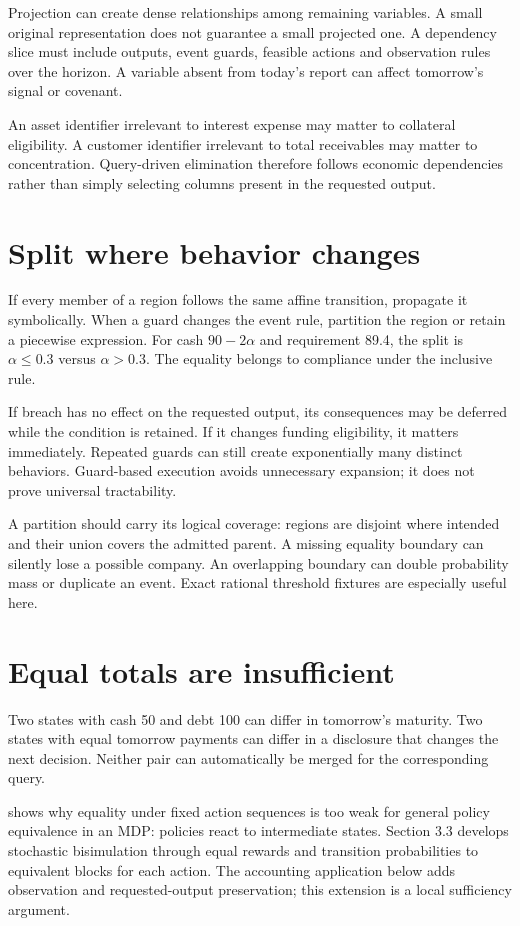 Projection can create dense relationships among remaining variables. A small original representation does not guarantee a small projected one. A dependency slice must include outputs, event guards, feasible actions and observation rules over the horizon. A variable absent from today's report can affect tomorrow's signal or covenant.

An asset identifier irrelevant to interest expense may matter to collateral eligibility. A customer identifier irrelevant to total receivables may matter to concentration. Query-driven elimination therefore follows economic dependencies rather than simply selecting columns present in the requested output.

\section{Split where behavior changes}
If every member of a region follows the same affine transition, propagate it symbolically. When a guard changes the event rule, partition the region or retain a piecewise expression. For cash $90-2\alpha$ and requirement 89.4, the split is $\alpha\leq0.3$ versus $\alpha>0.3$. The equality belongs to compliance under the inclusive rule.

If breach has no effect on the requested output, its consequences may be deferred while the condition is retained. If it changes funding eligibility, it matters immediately. Repeated guards can still create exponentially many distinct behaviors. Guard-based execution avoids unnecessary expansion; it does not prove universal tractability.

A partition should carry its logical coverage: regions are disjoint where intended and their union covers the admitted parent. A missing equality boundary can silently lose a possible company. An overlapping boundary can double probability mass or duplicate an event. Exact rational threshold fixtures are especially useful here.

\section{Equal totals are insufficient}
Two states with cash 50 and debt 100 can differ in tomorrow's maturity. Two states with equal tomorrow payments can differ in a disclosure that changes the next decision. Neither pair can automatically be merged for the corresponding query.

\citet[Section 3.1]{givan2003} shows why equality under fixed action sequences is too weak for general policy equivalence in an MDP: policies react to intermediate states. Section 3.3 develops stochastic bisimulation through equal rewards and transition probabilities to equivalent blocks for each action. The accounting application below adds observation and requested-output preservation; this extension is a local sufficiency argument.

